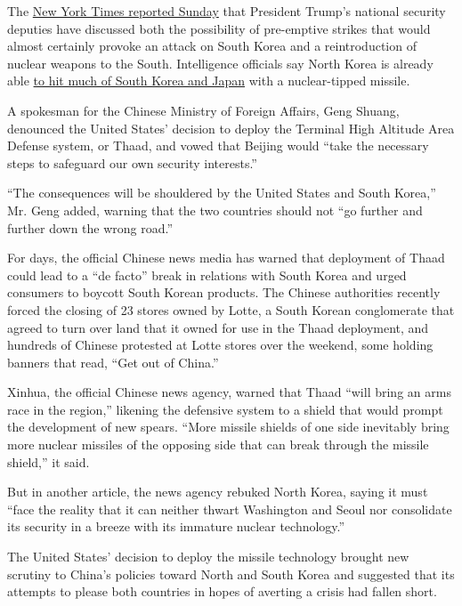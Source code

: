 The
\href{https://www.nytimes3xbfgragh.onion/2017/03/04/world/asia/north-korea-missile-program-sabotage.html}{New
York Times reported Sunday} that President Trump's national security
deputies have discussed both the possibility of pre-emptive strikes that
would almost certainly provoke an attack on South Korea and a
reintroduction of nuclear weapons to the South. Intelligence officials
say North Korea is already able
\href{https://www.nytimes3xbfgragh.onion/2016/05/07/world/asia/north-korea-nuclear-us-strategy.html}{to
hit much of South Korea and Japan} with a nuclear-tipped missile.

A spokesman for the Chinese Ministry of Foreign Affairs, Geng Shuang,
denounced the United States' decision to deploy the Terminal High
Altitude Area Defense system, or Thaad, and vowed that Beijing would
``take the necessary steps to safeguard our own security interests.''

``The consequences will be shouldered by the United States and South
Korea,'' Mr. Geng added, warning that the two countries should not ``go
further and further down the wrong road.''

For days, the official Chinese news media has warned that deployment of
Thaad could lead to a ``de facto'' break in relations with South Korea
and urged consumers to boycott South Korean products. The Chinese
authorities recently forced the closing of 23 stores owned by Lotte, a
South Korean conglomerate that agreed to turn over land that it owned
for use in the Thaad deployment, and hundreds of Chinese protested at
Lotte stores over the weekend, some holding banners that read, ``Get out
of China.''

Xinhua, the official Chinese news agency, warned that Thaad ``will bring
an arms race in the region,'' likening the defensive system to a shield
that would prompt the development of new spears. ``More missile shields
of one side inevitably bring more nuclear missiles of the opposing side
that can break through the missile shield,'' it said.

But in another article, the news agency rebuked North Korea, saying it
must ``face the reality that it can neither thwart Washington and Seoul
nor consolidate its security in a breeze with its immature nuclear
technology.''

The United States' decision to deploy the missile technology brought new
scrutiny to China's policies toward North and South Korea and suggested
that its attempts to please both countries in hopes of averting a crisis
had fallen short.

